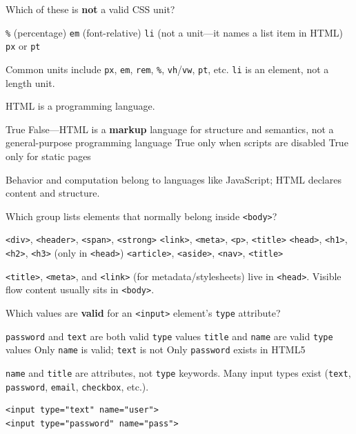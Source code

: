\question[4]
Which of these is \textbf{not} a valid CSS unit?
\begin{choices}
  \choice \texttt{\%} (percentage)
  \choice \texttt{em} (font-relative)
  \CorrectChoice \texttt{li} (not a unit---it names a list item in HTML)
  \choice \texttt{px} or \texttt{pt}
\end{choices}
\begin{solution}
  Common units include \texttt{px}, \texttt{em}, \texttt{rem}, \texttt{\%}, \texttt{vh}/\texttt{vw}, \texttt{pt}, etc. \texttt{li} is an element, not a length unit.
\end{solution}

\question[4]
HTML is a programming language.
\begin{choices}
  \choice True
  \CorrectChoice False---HTML is a \textbf{markup} language for structure and semantics, not a general-purpose programming language
  \choice True only when scripts are disabled
  \choice True only for static pages
\end{choices}
\begin{solution}
  Behavior and computation belong to languages like JavaScript; HTML declares content and structure.
\end{solution}

\question[4]
Which group lists elements that normally belong inside \texttt{<body>}?
\begin{choices}
  \CorrectChoice \texttt{<div>}, \texttt{<header>}, \texttt{<span>}, \texttt{<strong>}
  \choice \texttt{<link>}, \texttt{<meta>}, \texttt{<p>}, \texttt{<title>}
  \choice \texttt{<head>}, \texttt{<h1>}, \texttt{<h2>}, \texttt{<h3>} (only in \texttt{<head>})
  \choice \texttt{<article>}, \texttt{<aside>}, \texttt{<nav>}, \texttt{<title>}
\end{choices}
\begin{solution}
  \texttt{<title>}, \texttt{<meta>}, and \texttt{<link>} (for metadata/stylesheets) live in \texttt{<head>}. Visible flow content usually sits in \texttt{<body>}.
\end{solution}

\question[4]
Which values are \textbf{valid} for an \texttt{<input>} element's \texttt{type} attribute?
\begin{choices}
  \CorrectChoice \texttt{password} and \texttt{text} are both valid \texttt{type} values
  \choice \texttt{title} and \texttt{name} are valid \texttt{type} values
  \choice Only \texttt{name} is valid; \texttt{text} is not
  \choice Only \texttt{password} exists in HTML5
\end{choices}
\begin{solution}
  \texttt{name} and \texttt{title} are attributes, not \texttt{type} keywords. Many input types exist (\texttt{text}, \texttt{password}, \texttt{email}, \texttt{checkbox}, etc.).
\begin{lstlisting}[style=htmlexam]
<input type="text" name="user">
<input type="password" name="pass">
\end{lstlisting}
\end{solution}

